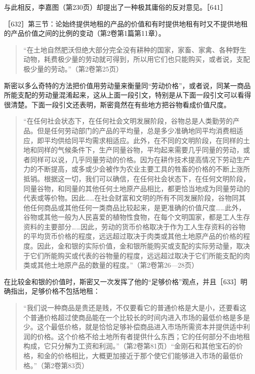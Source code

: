 与此相反，李嘉图（第230页）却提出了一种极其庸俗的反对意见。［641］


［632］第三节：论始终提供地租的产品的价值和有时提供地租有时又不提供地租的产品价值之间的比例的变动（第2卷第1篇第11章）。

\begin{quote}{“在土地自然肥沃但绝大部分完全没有耕种的国家，家畜、家禽、各种野生动物，耗费极少量的劳动就可得到，所以用它们也只能购买，或者说，支配极少量的劳动。”（第2卷第25页）}\end{quote}

斯密以多么奇特的方法把价值用劳动量来衡量同“劳动价格”，或者说，同某一商品所能支配的劳动量混淆起来，这从上面一段引文，特别是从下面一段引文可以看得很清楚。下面一段引文还表明，斯密竟然在有些地方把谷物看成价值尺度。

\begin{quote}{“在任何社会状态下，在任何社会文明发展阶段，谷物总是人类勤劳的产品。但是任何劳动部门的产品的平均量，总是多少准确地同平均消费相适应，即平均供给同平均需求相适应。此外，在不同的文明阶段，在同样的土地和同样的气候条件下，生产同量谷物，平均起来需要几乎同量的劳动，或者同样可以说，几乎同量劳动的价格。因为在耕作技术提高情况下劳动生产力的不断提高，或多或少会被作为农业主要工具的牲畜的价格的不断上涨所抵销。根据这一切，我们可以确信，在任何社会状态下，在任何文明阶段，同量谷物，和同量的其他任何土地原产品相比，都更恰当地成为同量劳动的代表或等价物。因此……在社会财富和文明的所有不同发展阶段，谷物同其他任何商品或其他任何一类商品比较起来，是更准确的价值尺度……此外，谷物或其他一般为人民喜爱的植物性食物，在每个文明国家，都是工人生存资料的主要部分……因此，劳动的货币价格取决于作为工人生存资料的谷物的平均货币价格的程度，远远超过取决于肉类或其他土地原产品的价格的程度。因此，金和银的实际价值，金和银所能购买或支配的实际劳动量，取决于它们所能购买或代表的谷物量的程度，远远超过取决于它们所能支配的肉类或其他土地原产品的数量的程度。”（第2卷第26—28页）}\end{quote}

在比较金和银的价值时，斯密又一次发挥了他的“足够价格”观点，并且［633］明确指出，足够价格不包括地租：

\begin{quote}{“我们说一种商品是贵还是贱，不仅要看它的普通价格是大是小，还要看这个普通价格超过使商品能在一个比较长的时间内进入市场的最低价格是多是少。这个最低价格，就是恰恰足够补偿商品进入市场所需资本并提供适中利润的价格。这个价格不给土地所有者提供什么东西；它的任何部分不由地租构成，它只分解为工资和利润。”（第2卷第81页）“金刚石和其他宝石的价格，和金的价格相比，大概更加接近于那个使它们能够进入市场的最低价格。”（第2卷第83页）}\end{quote}

